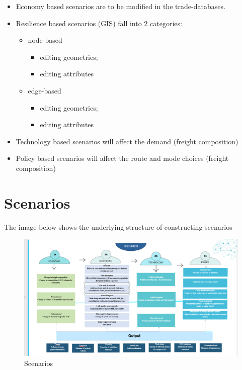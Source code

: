 \documentclass[
]{book}
\providecommand{\tightlist}{%
  \setlength{\itemsep}{0pt}\setlength{\parskip}{0pt}}
\begin{document}
\begin{itemize}
\tightlist
\item
  Economy based scenarios are to be modified in the trade-databases.
\item
  Resilience based scenarios (GIS) fall into 2 categories:

  \begin{itemize}
  \tightlist
  \item
    node-based

    \begin{itemize}
    \tightlist
    \item
      editing geometries;
    \item
      editing attributes
    \end{itemize}
  \item
    edge-based

    \begin{itemize}
    \tightlist
    \item
      editing geometries;
    \item
      editing attributes
    \end{itemize}
  \end{itemize}
\item
  Technology based scenarios will affect the demand (freight composition)
\item
  Policy based scenarios will affect the route and mode choices (freight composition)
\end{itemize}

\chapter{Scenarios}\label{scenarios}

The image below shows the underlying structure of constructing scenarios

\begin{figure}
\centering
\includegraphics{images/Picture1.png}
\caption{Scenarios}
\end{figure}
\end{document}

